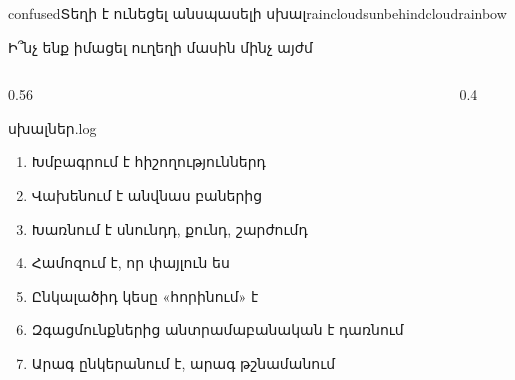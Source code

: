 
%
  {    }%
  {confused}{Տեղի է ունեցել անսպասելի սխալ}{{raincloud}{sunbehindcloud}{rainbow}}

\begin{frame}{Ի՞նչ ենք իմացել ուղեղի մասին մինչ այժմ}
  \begin{columns}[c]
    \begin{column}{0.56\textwidth}
      \begin{popup}{սխալներ.log}
        \small
        \begin{enumerate}\setlength{\itemsep}{0.2mm}
          \item Խմբագրում է հիշողություններդ
          \item Վախենում է անվնաս բաներից
          \item Խառնում է սնունդդ, քունդ, շարժումդ
          \item Համոզում է, որ փայլուն ես
          \item Ընկալածիդ կեսը «հորինում» է
          \item Զգացմունքներից անտրամաբանական է դառնում
          \item Արագ ընկերանում է, արագ թշնամանում
        \end{enumerate}
      \end{popup}
    \end{column}
    \begin{column}{0.4\textwidth}
      \vspace{1mm}
    \end{column}
  \end{columns}
\end{frame}

